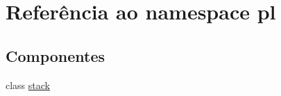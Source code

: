 \hypertarget{namespacepl}{}\section{Referência ao namespace pl}
\label{namespacepl}
\subsection*{Componentes}
\begin{DoxyCompactItemize}
\item 
class \hyperlink{classpl_1_1stack}{stack}
\end{DoxyCompactItemize}
